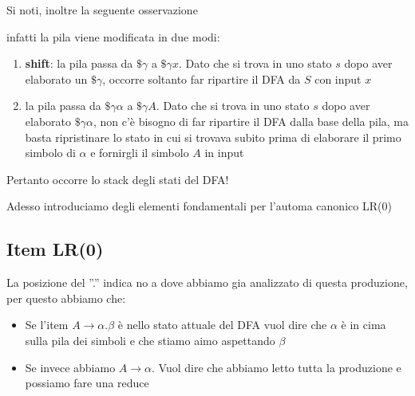 Si noti, inoltre la seguente osservazione

infatti la pila viene modificata in due modi:
\begin{enumerate}
    \item \textbf{shift}: la pila passa da $\$ \gamma$ a $\$\gamma x$. Dato che si trova in uno stato $s$ dopo aver elaborato un $\$\gamma$, occorre soltanto far ripartire il DFA da $S$ con input $x$
    \item la pila passa da $\$ \gamma\alpha$ a $\$ \gamma A$. Dato che si trova in uno stato $s$ dopo aver elaborato $\$ \gamma \alpha$, non c'è bisogno di far ripartire il DFA dalla base della pila, ma basta ripristinare lo stato in cui si trovava subito prima di elaborare il primo simbolo di $\alpha$ e fornirgli il simbolo $A$ in input
\end{enumerate}

Pertanto occorre lo stack degli stati del DFA!

Adesso introduciamo degli elementi fondamentali per l'automa canonico LR(0)

\subsection{Item LR(0)}



La posizione del ”.” indica no a dove abbiamo gia analizzato di questa produzione, per questo abbiamo che: 
\begin{itemize}
    \item Se l'item $A\to\alpha . \beta$ è nello stato attuale del DFA vuol dire che $\alpha$ è in cima sulla pila dei simboli e che stiamo aimo aspettando $\beta$
    \item Se invece abbiamo $A\to \alpha$. Vuol dire che abbiamo letto tutta la produzione e possiamo fare una reduce 
\end{itemize}

